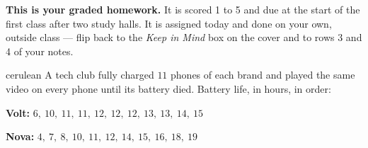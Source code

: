 \documentclass[12pt]{article}
\begin{document}

\vspace{0.12in}

\begin{remindbox}
\small
\textbf{This is your graded homework.} It is scored 1 to 5 and due at
the start of the first class after two study halls. It is assigned today and done on your own,
outside class --- flip back to the \emph{Keep in Mind} box on the cover and to rows 3 and 4 of
your notes.
\end{remindbox}

\vspace{0.08in}

\boxguard[20]
\begin{scenariobox}{cerulean}
A tech club fully charged $11$ phones of each brand and played the same video on every phone
until its battery died. Battery life, in hours, in order:

\vspace{3pt}
\textbf{Volt:} \quad $6,\ 10,\ 11,\ 11,\ 12,\ 12,\ 12,\ 13,\ 13,\ 14,\ 15$
\par\vspace{2pt}
\textbf{Nova:} \quad $4,\ 7,\ 8,\ 10,\ 11,\ 12,\ 14,\ 15,\ 16,\ 18,\ 19$
\end{scenariobox}

\vspace{0.08in}
\end{document}
